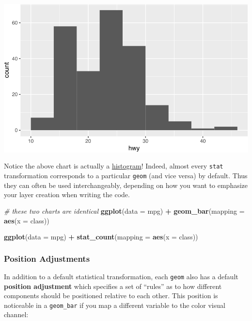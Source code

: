 \documentclass[]{book}
\newenvironment{Shaded}{\begin{snugshade}}{\end{snugshade}}
\newcommand{\KeywordTok}[1]{\textcolor[rgb]{0.13,0.29,0.53}{\textbf{#1}}}
\newcommand{\DataTypeTok}[1]{\textcolor[rgb]{0.13,0.29,0.53}{#1}}
\newcommand{\StringTok}[1]{\textcolor[rgb]{0.31,0.60,0.02}{#1}}
\newcommand{\CommentTok}[1]{\textcolor[rgb]{0.56,0.35,0.01}{\textit{#1}}}
\newcommand{\OperatorTok}[1]{\textcolor[rgb]{0.81,0.36,0.00}{\textbf{#1}}}
\newcommand{\NormalTok}[1]{#1}
\theoremstyle{definition}
\theoremstyle{definition}
\theoremstyle{remark}
\begin{document}
\includegraphics{img/ggplot2/stat_summary-1.pdf}

Notice the above chart is actually a
\href{https://en.wikipedia.org/wiki/Histogram}{histogram}! Indeed,
almost every \texttt{stat} transformation corresponds to a particular
\texttt{geom} (and vice versa) by default. Thus they can often be used
interchangeably, depending on how you want to emphasize your layer
creation when writing the code.

\begin{Shaded}
\begin{Highlighting}[]
\CommentTok{# these two charts are identical}
\KeywordTok{ggplot}\NormalTok{(}\DataTypeTok{data =}\NormalTok{ mpg) }\OperatorTok{+}
\StringTok{  }\KeywordTok{geom_bar}\NormalTok{(}\DataTypeTok{mapping =} \KeywordTok{aes}\NormalTok{(}\DataTypeTok{x =}\NormalTok{ class))}

\KeywordTok{ggplot}\NormalTok{(}\DataTypeTok{data =}\NormalTok{ mpg) }\OperatorTok{+}
\StringTok{  }\KeywordTok{stat_count}\NormalTok{(}\DataTypeTok{mapping =} \KeywordTok{aes}\NormalTok{(}\DataTypeTok{x =}\NormalTok{ class))}
\end{Highlighting}
\end{Shaded}

\subsubsection{Position Adjustments}\label{position-adjustments}

In addition to a default statistical transformation, each \texttt{geom}
also has a default \textbf{position adjustment} which specifies a set of
``rules'' as to how different components should be positioned relative
to each other. This position is noticeable in a \texttt{geom\_bar} if
you map a different variable to the color visual channel:
\end{document}
